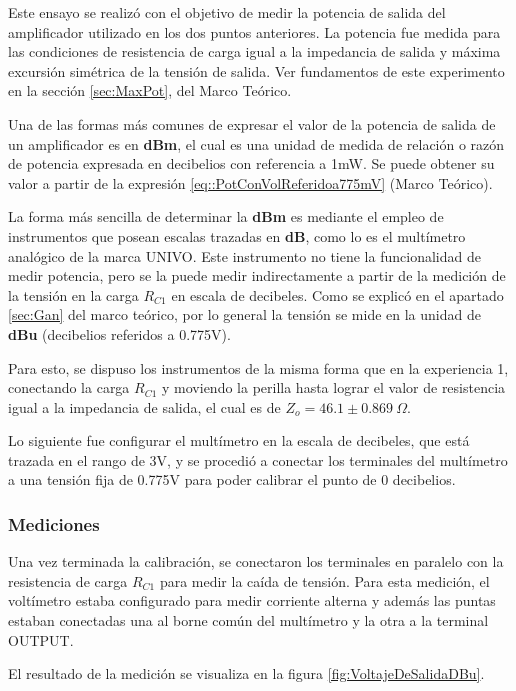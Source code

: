 Este ensayo se realizó con el objetivo de medir la potencia de salida del amplificador utilizado en los dos puntos anteriores. La potencia fue medida para las condiciones de resistencia de carga igual a la impedancia de salida y máxima excursión simétrica de la tensión de salida. Ver fundamentos de este experimento en la sección \ref{sec:MaxPot}, del Marco Teórico.

Una de las formas más comunes de expresar el valor de la potencia de salida de un amplificador es en \textbf{dBm}, el cual es una unidad de medida de relación o razón de potencia expresada en decibelios con referencia a 1mW. Se puede obtener su valor a partir de la expresión \ref{eq::PotConVolReferidoa775mV} (Marco Teórico).

La forma más sencilla de determinar la \textbf{dBm} es mediante el empleo de instrumentos que posean escalas trazadas en \textbf{dB}, como lo es el multímetro analógico de la marca UNIVO.
Este instrumento no tiene la funcionalidad de medir potencia, pero se la puede medir indirectamente a partir de la medición de la tensión en la carga $R_{C1}$ en escala de decibeles. Como se explicó en el apartado \ref{sec:Gan} del marco teórico, por lo general la tensión se mide en la unidad de \textbf{dBu} (decibelios referidos a 0.775V).

Para esto, se dispuso los instrumentos de la misma forma que en la experiencia 1, conectando la carga $R_{C1}$ y moviendo la perilla hasta lograr el valor de resistencia igual a la impedancia de salida, el cual es de $ Z_o = 46.1 \pm 0.869  ~\Omega$.

Lo siguiente fue configurar el multímetro en la escala de decibeles, que está trazada
en el rango de 3V, y se procedió a conectar los terminales del multímetro a una tensión fija de 0.775V para poder calibrar el punto de 0 decibelios. 

\subsubsection{Mediciones}

Una vez terminada la calibración, se conectaron los terminales en paralelo con la resistencia de carga $R_{C1}$ para medir la caída de tensión. Para esta medición, el voltímetro estaba configurado para medir corriente alterna y además las puntas estaban conectadas una al borne común del multímetro y la otra a la terminal OUTPUT.

El resultado de la medición se visualiza en la figura \ref{fig:VoltajeDeSalidaDBu}.

